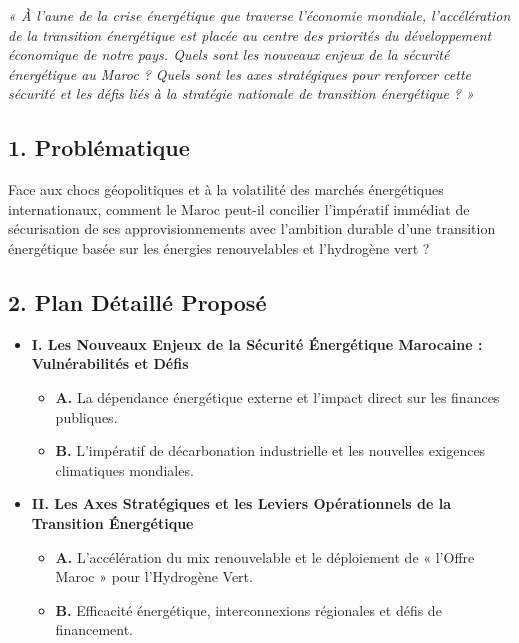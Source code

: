 \begin{tcolorbox}[colback=blue!5!white,colframe=blue!75!black,title=\textbf{Énoncé Officiel du Sujet (28 Avril 2024)}]
\textit{« À l'aune de la crise énergétique que traverse l'économie mondiale, l'accélération de la transition énergétique est placée au centre des priorités du développement économique de notre pays. Quels sont les nouveaux enjeux de la sécurité énergétique au Maroc ? Quels sont les axes stratégiques pour renforcer cette sécurité et les défis liés à la stratégie nationale de transition énergétique ? »}
\end{tcolorbox}

\subsection*{1. Problématique}
Face aux chocs géopolitiques et à la volatilité des marchés énergétiques internationaux, comment le Maroc peut-il concilier l'impératif immédiat de sécurisation de ses approvisionnements avec l'ambition durable d'une transition énergétique basée sur les énergies renouvelables et l'hydrogène vert ?

\subsection*{2. Plan Détaillé Proposé}
\begin{itemize}
    \item \textbf{I. Les Nouveaux Enjeux de la Sécurité Énergétique Marocaine : Vulnérabilités et Défis}
    \begin{itemize}
        \item \textbf{A.} La dépendance énergétique externe et l'impact direct sur les finances publiques.
        \item \textbf{B.} L'impératif de décarbonation industrielle et les nouvelles exigences climatiques mondiales.
    \end{itemize}
    \item \textbf{II. Les Axes Stratégiques et les Leviers Opérationnels de la Transition Énergétique}
    \begin{itemize}
        \item \textbf{A.} L'accélération du mix renouvelable et le déploiement de « l'Offre Maroc » pour l'Hydrogène Vert.
        \item \textbf{B.} Efficacité énergétique, interconnexions régionales et défis de financement.
    \end{itemize}
\end{itemize}

